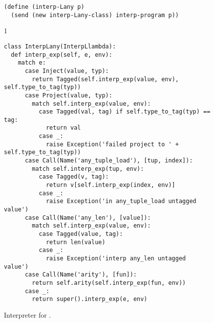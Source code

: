 \documentclass[7x10]{TimesAPriori_MIT}%
\def\pythonEd{1}
\def\edition{1}
\newcommand{\pythonColor}[0]{}
\numberwithin{theorem}{chapter}
\numberwithin{definition}{chapter}
\numberwithin{equation}{chapter}
\begin{document}
\begin{figure}[tbp]
\begin{tcolorbox}[colback=white]
{\begin{lstlisting}[basicstyle=\ttfamily\footnotesize]
(define (interp-Lany p)
  (send (new interp-Lany-class) interp-program p))
\end{lstlisting}
\fi}
{\if\edition\pythonEd\pythonColor
\begin{lstlisting}[basicstyle=\ttfamily\footnotesize]
class InterpLany(InterpLlambda):
  def interp_exp(self, e, env):
    match e:
      case Inject(value, typ):
        return Tagged(self.interp_exp(value, env), self.type_to_tag(typ))
      case Project(value, typ):
        match self.interp_exp(value, env):
          case Tagged(val, tag) if self.type_to_tag(typ) == tag:
            return val
          case _:
            raise Exception('failed project to ' + self.type_to_tag(typ))
      case Call(Name('any_tuple_load'), [tup, index]):
        match self.interp_exp(tup, env):
          case Tagged(v, tag):
            return v[self.interp_exp(index, env)]
          case _:
            raise Exception('in any_tuple_load untagged value')
      case Call(Name('any_len'), [value]):
        match self.interp_exp(value, env):
          case Tagged(value, tag):
            return len(value)
          case _:
            raise Exception('interp any_len untagged value')
      case Call(Name('arity'), [fun]):
        return self.arity(self.interp_exp(fun, env))
      case _:
        return super().interp_exp(e, env)
\end{lstlisting}
\fi}
  \end{tcolorbox}
\caption{Interpreter for \LangAny{}.}
\label{fig:interp-Lany}
\end{figure}
\end{document}
